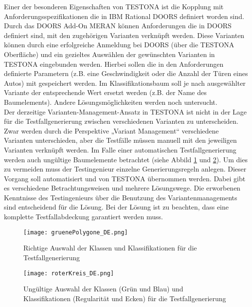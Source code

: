 Einer der besonderen Eigenschaften von TESTONA ist die Kopplung mit Anforderungsspezifikationen die in IBM Rational DOORS definiert worden sind. Durch das DOORS Add-On MERAN können Anforderungen die in DOORS definiert sind, mit den zugehörigen Varianten verknüpft werden. Diese Varianten können durch eine erfolgreiche Anmeldung bei DOORS (über die TESTONA Oberfläche) und ein gezieltes Auswählen der gewünschten Varianten in TESTONA eingebunden werden. Hierbei sollen die in den Anforderungen definierte Parametern (z.B. eine Geschwindigkeit oder die Anzahl der Türen eines Autos) mit gespeichert werden. Im Klassifikationsbaum soll je nach ausgewählter Variante der entsprechende Wert ersetzt werden (z.B. der Name des Baumelements). Andere Lösungsmöglichkeiten werden noch untersucht.\\

Der derzeitige Varianten-Management-Ansatz in TESTONA ist nicht in der Lage für die Testfallgenerierung zwischen verschiedenen Varianten zu unterscheiden. Zwar werden durch die Perspektive „Variant Management“ verschiedene Varianten unterschieden, aber die Testfälle müssen manuell mit den jeweiligen Varianten verknüpft werden. Im Falle einer automatischen Testfallgenerierung werden auch ungültige Baumelemente betrachtet (siehe Abbild \ref{ttn.gruen} und \ref{ttn.rot}). Um dies zu vermeiden muss der Testingenieur einzelne Generierungsregeln anlegen. Dieser Vorgang soll automatisiert und von TESTONA übernommen werden. Dabei gibt es verschiedene Betrachtungsweisen und mehrere Lösungswege. Die erworbenen Kenntnisse des Testingenieurs über die Benutzung des Variantenmanagements sind entscheidend für die Lösung. Bei der Lösung ist zu beachten, dass eine komplette Testfallabdeckung garantiert werden muss.\\


\begin{figure}[h]
  \begin{center}
    \texttt{[image: gruenePolygone\_DE.png]}
  		  \caption{Richtige Auswahl der Klassen und Klassifikationen für die Testfallgenerierung}
     \label{ttn.gruen}
  \end{center}
\end{figure}


\begin{figure}[h]
  \begin{center}
    \texttt{[image: roterKreis\_DE.png]}
  		  \caption{Ungültige Auswahl der Klassen (Grün und Blau) und Klassifikationen (Regularität und Ecken) für die Testfallgenerierung}
     \label{ttn.rot}
  \end{center}
\end{figure}


